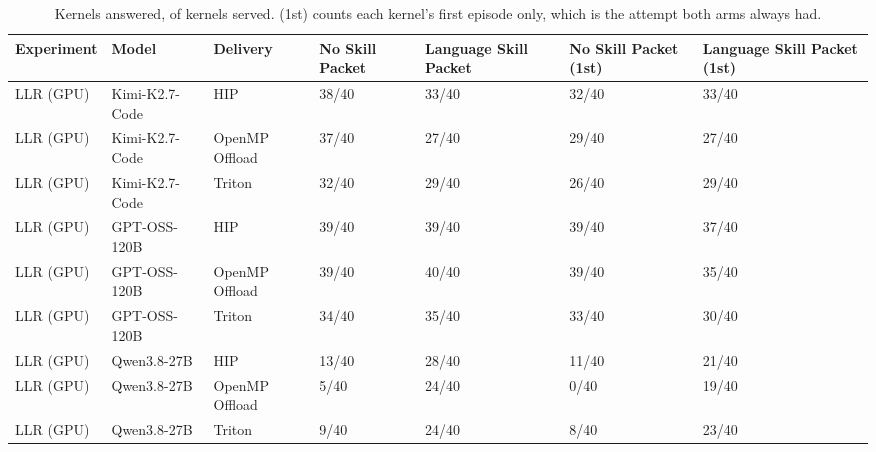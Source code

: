 \begin{table}[t]
  \centering
  \caption{Kernels answered, of kernels served. (1st) counts each kernel's first episode only, which is the attempt both arms always had.}
  \label{tab:solve-rate}
  \begin{tabular}{lllllll}
    \toprule
    Experiment & Model & Delivery & No Skill Packet & Language Skill Packet & No Skill Packet (1st) & Language Skill Packet (1st) \\
    \midrule
    LLR (GPU) & Kimi-K2.7-Code & HIP & 38/40 & 33/40 & 32/40 & 33/40 \\
    LLR (GPU) & Kimi-K2.7-Code & OpenMP Offload & 37/40 & 27/40 & 29/40 & 27/40 \\
    LLR (GPU) & Kimi-K2.7-Code & Triton & 32/40 & 29/40 & 26/40 & 29/40 \\
    LLR (GPU) & GPT-OSS-120B & HIP & 39/40 & 39/40 & 39/40 & 37/40 \\
    LLR (GPU) & GPT-OSS-120B & OpenMP Offload & 39/40 & 40/40 & 39/40 & 35/40 \\
    LLR (GPU) & GPT-OSS-120B & Triton & 34/40 & 35/40 & 33/40 & 30/40 \\
    LLR (GPU) & Qwen3.8-27B & HIP & 13/40 & 28/40 & 11/40 & 21/40 \\
    LLR (GPU) & Qwen3.8-27B & OpenMP Offload & 5/40 & 24/40 & 0/40 & 19/40 \\
    LLR (GPU) & Qwen3.8-27B & Triton & 9/40 & 24/40 & 8/40 & 23/40 \\
    \bottomrule
  \end{tabular}
\end{table}
